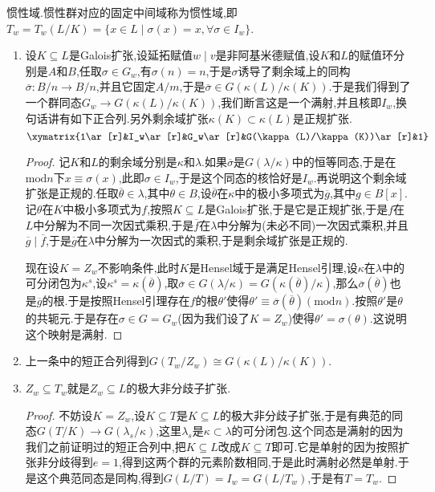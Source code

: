 惯性域.惯性群对应的固定中间域称为惯性域,即$T_w=T_w(L/K)=\{x\in L\mid\sigma(x)=x,\forall\sigma\in I_w\}$.
\begin{enumerate}
	\item 设$K\subseteq L$是Galois扩张,设延拓赋值$w\mid v$是非阿基米德赋值,设$K$和$L$的赋值环分别是$A$和$B$,任取$\sigma\in G_w$,有$\sigma(n)=n$,于是$\sigma$诱导了剩余域上的同构$\overline{\sigma}:B/n\to B/n$,并且它固定$A/m$,于是$\overline{\sigma}\in G(\kappa(L)/\kappa(K))$.于是我们得到了一个群同态$G_w\to G(\kappa(L)/\kappa(K))$,我们断言这是一个满射,并且核即$I_w$,换句话讲有如下正合列.另外剩余域扩张$\kappa(K)\subset\kappa(L)$是正规扩张.
	$$\xymatrix{1\ar[r]&I_w\ar[r]&G_w\ar[r]&G(\kappa(L)/\kappa(K))\ar[r]&1}$$
	\begin{proof}
		
		记$K$和$L$的剩余域分别是$\kappa$和$\lambda$.如果$\overline{\sigma}$是$G(\lambda/\kappa)$中的恒等同态,于是在$\mathrm{mod}n$下$x\equiv\sigma(x)$,此即$\sigma\in I_w$,于是这个同态的核恰好是$I_w$.再说明这个剩余域扩张是正规的.任取$\overline{\theta}\in\lambda$,其中$\theta\in B$,设$\overline{\theta}$在$\kappa$中的极小多项式为$\overline{g}$,其中$g\in B[x]$.记$\theta$在$K$中极小多项式为$f$,按照$K\subseteq L$是Galois扩张,于是它是正规扩张,于是$f$在$L$中分解为不同一次因式乘积,于是$\overline{f}$在$\lambda$中分解为(未必不同)一次因式乘积,并且$\overline{g}\mid\overline{f}$,于是$\overline{g}$在$\lambda$中分解为一次因式的乘积,于是剩余域扩张是正规的.
		
		现在设$K=Z_w$不影响条件,此时$K$是Hensel域于是满足Hensel引理,设$\kappa$在$\lambda$中的可分闭包为$\kappa^s$,设$\kappa^s=\kappa(\overline{\theta})$,取$\overline{\sigma}\in G(\lambda/\kappa)=G(\kappa(\overline{\theta})/\kappa)$,那么$\overline{\sigma}(\overline{\theta})$也是$\overline{g}$的根.于是按照Hensel引理存在$f$的根$\theta'$使得$\theta'\equiv\overline{\sigma}(\overline{\theta})(\mathrm{mod}n)$.按照$\theta'$是$\theta$的共轭元.于是存在$\sigma\in G=G_w$(因为我们设了$K=Z_w$)使得$\theta'=\sigma(\theta)$.这说明这个映射是满射.
	\end{proof}
	\item 上一条中的短正合列得到$G(T_w/Z_w)\cong G(\kappa(L)/\kappa(K))$.
	\item $Z_w\subseteq T_w$就是$Z_w\subseteq L$的极大非分歧子扩张.
	\begin{proof}
		
		不妨设$K=Z_w$,设$K\subseteq T$是$K\subseteq L$的极大非分歧子扩张,于是有典范的同态$G(T/K)\to G(\lambda_s/\kappa)$,这里$\lambda_s$是$\kappa\subset\lambda$的可分闭包.这个同态是满射的因为我们之前证明过的短正合列中,把$K\subseteq L$改成$K\subseteq T$即可.它是单射的因为按照扩张非分歧得到$e=1$,得到这两个群的元素阶数相同,于是此时满射必然是单射.于是这个典范同态是同构,得到$G(L/T)=I_w=G(L/T_w)$,于是有$T=T_w$.
	\end{proof}
\end{enumerate}

